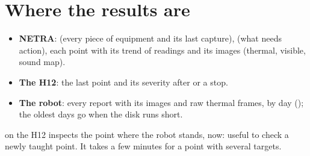 \section{Where the results are}

\begin{itemize}
  \item \textbf{NETRA}:  (every piece of equipment and its last
    capture),  (what needs action), each point with its trend of readings and
    its images (thermal, visible, sound map).
  \item \textbf{The H12}: the last point and its severity after  or a stop.
  \item \textbf{The robot}: every report with its images and raw thermal frames, by day
    (); the oldest days go when the disk runs short.
\end{itemize}

 on the H12 inspects the point where the robot stands, now: useful to check a
newly taught point. It takes a few minutes for a point with several targets.
